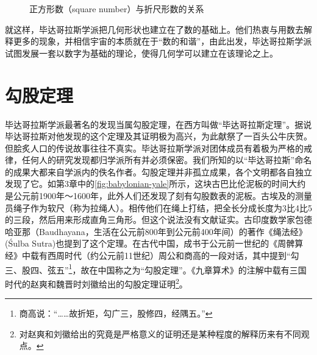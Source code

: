 \documentclass[b5paper]{ctexart}
\begin{document}
\begin{figure}[htbp]
\centering
{}
\caption{正方形数（square number）与折尺形数的关系}
\label{fig:square-num}
\end{figure}

就这样，毕达哥拉斯学派把几何形状也建立在了数的基础上。他们热衷与用数去解释更多的现象，并相信宇宙的本质就在于“数的和谐”，由此出发，毕达哥拉斯学派试图发展一套以数字为基础的理论，使得几何学可以建立在该理论之上。

\section{勾股定理}
毕达哥拉斯学派最著名的发现当属勾股定理，在西方叫做“毕达哥拉斯定理”。据说毕达哥拉斯对他发现的这个定理及其证明极为高兴，为此献祭了一百头公牛庆贺。但脍炙人口的传说故事往往不真实。毕达哥拉斯学派对团体成员有着极为严格的戒律，任何人的研究发现都归学派所有并必须保密。我们所知的以“毕达哥拉斯”命名的成果大都来自学派内的佚名作者。勾股定理并非孤立成果，各个文明都各自独立发现了它。如第3章中的\cref{fig:babylonian-yale}所示，这块古巴比伦泥板的时间大约是公元前1900年～1600年，此外人们还发现了刻有勾股数表的泥板。古埃及的测量员绳子作为软尺（称为拉绳人）。相传他们在绳上打结，把全长分成长度为3比4比5的三段，然后用来形成直角三角形。但这个说法没有文献证实。古印度数学家包德哈亚那（Baudhayana，生活在公元前800年到公元前400年间）的著作《绳法经》(Śulba Sutra)也提到了这个定理。在古代中国，成书于公元前一世纪的《周髀算经》中载有西周时代（约公元前11世纪）周公和商高的一段对话，其中提到“勾三、股四、弦五”\footnote{商高说：“……故折矩，勾广三，股修四，经隅五。”}，故在中国称之为“勾股定理”。《九章算术》的注解中载有三国时代的赵爽和魏晋时刘徽给出的勾股定理证明\footnote{对赵爽和刘徽给出的究竟是严格意义的证明还是某种程度的解释历来有不同观点。}。
\end{document}
